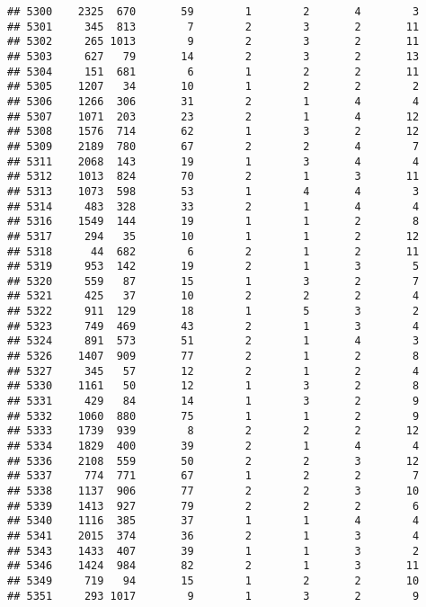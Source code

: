 \documentclass[]{article}
\begin{document}
\begin{verbatim}
## 5300    2325  670       59        1        2       4        3
## 5301     345  813        7        2        3       2       11
## 5302     265 1013        9        2        3       2       11
## 5303     627   79       14        2        3       2       13
## 5304     151  681        6        1        2       2       11
## 5305    1207   34       10        1        2       2        2
## 5306    1266  306       31        2        1       4        4
## 5307    1071  203       23        2        1       4       12
## 5308    1576  714       62        1        3       2       12
## 5309    2189  780       67        2        2       4        7
## 5311    2068  143       19        1        3       4        4
## 5312    1013  824       70        2        1       3       11
## 5313    1073  598       53        1        4       4        3
## 5314     483  328       33        2        1       4        4
## 5316    1549  144       19        1        1       2        8
## 5317     294   35       10        1        1       2       12
## 5318      44  682        6        2        1       2       11
## 5319     953  142       19        2        1       3        5
## 5320     559   87       15        1        3       2        7
## 5321     425   37       10        2        2       2        4
## 5322     911  129       18        1        5       3        2
## 5323     749  469       43        2        1       3        4
## 5324     891  573       51        2        1       4        3
## 5326    1407  909       77        2        1       2        8
## 5327     345   57       12        2        1       2        4
## 5330    1161   50       12        1        3       2        8
## 5331     429   84       14        1        3       2        9
## 5332    1060  880       75        1        1       2        9
## 5333    1739  939        8        2        2       2       12
## 5334    1829  400       39        2        1       4        4
## 5336    2108  559       50        2        2       3       12
## 5337     774  771       67        1        2       2        7
## 5338    1137  906       77        2        2       3       10
## 5339    1413  927       79        2        2       2        6
## 5340    1116  385       37        1        1       4        4
## 5341    2015  374       36        2        1       3        4
## 5343    1433  407       39        1        1       3        2
## 5346    1424  984       82        2        1       3       11
## 5349     719   94       15        1        2       2       10
## 5351     293 1017        9        1        3       2        9

\end{verbatim}
\end{document}
